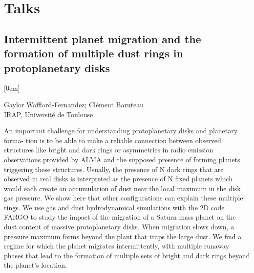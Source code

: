 \documentclass[a4paper,11pt]{book}
\begin{document}
\mainmatter


\chapter*{Talks}
        
          \section[Intermittent planet migration and the formation of multiple dust rings in protoplanetary disks \newline(Gaylor Wafflard-Fernandez)] { Intermittent planet migration and the formation of multiple dust rings in protoplanetary disks }



[0cm]



\begin{center}
    
{\large Gaylor Wafflard-Fernandez};{ \large  Clément Baruteau}\\
  
\vspace{2 mm}
\noindent IRAP, Université de Toulouse\\

\end{center}



  
\vspace{2 mm}
\noindent An important challenge for understanding protoplanetary disks and planetary forma- tion is to be able to make a reliable connection between observed structures like bright and dark rings or asymmetries in radio emission observations provided by ALMA and the supposed presence of forming planets triggering these structures. Usually, the presence of N dark rings that are observed in real disks is interpreted as the presence of N fixed planets which would each create an accumulation of dust near the local maximum in the disk gas pressure. We show here that other configurations can explain these multiple rings. We use gas and dust hydrodynamical simulations with the 2D code FARGO to study the impact of the migration of a Saturn mass planet on the dust content of massive protoplanetary disks. When migration slows down, a pressure maximum forms beyond the plant that traps the large dust. We find a regime for which the planet migrates intermittently, with multiple runaway phases that lead to the formation of multiple sets of bright and dark rings beyond the planet’s location.
\end{document}
